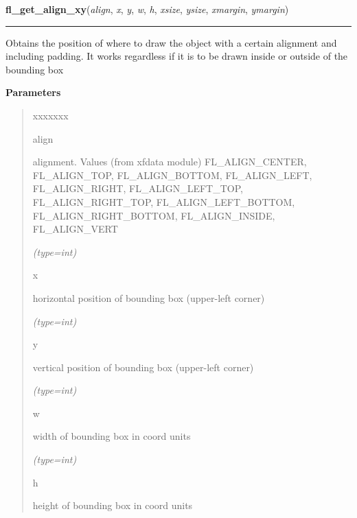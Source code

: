 \hspace{.8\funcindent}\begin{boxedminipage}{\funcwidth}

    \raggedright \textbf{fl\_get\_align\_xy}(\textit{align}, \textit{x}, \textit{y}, \textit{w}, \textit{h}, \textit{xsize}, \textit{ysize}, \textit{xmargin}, \textit{ymargin})

    \vspace{-1.5ex}

    \rule{\textwidth}{0.5\fboxrule}
\setlength{\parskip}{2ex}
    Obtains the position of where to draw the object with a certain 
    alignment and including padding. It works regardless if it is to be 
    drawn inside or outside of the bounding box

\setlength{\parskip}{1ex}
      \textbf{Parameters}
      \vspace{-1ex}

      \begin{quote}
        \begin{Ventry}{xxxxxxx}

          \item[align]

          alignment. Values (from xfdata module) FL\_ALIGN\_CENTER, 
          FL\_ALIGN\_TOP, FL\_ALIGN\_BOTTOM, FL\_ALIGN\_LEFT, 
          FL\_ALIGN\_RIGHT, FL\_ALIGN\_LEFT\_TOP, FL\_ALIGN\_RIGHT\_TOP, 
          FL\_ALIGN\_LEFT\_BOTTOM, FL\_ALIGN\_RIGHT\_BOTTOM, 
          FL\_ALIGN\_INSIDE, FL\_ALIGN\_VERT

            {\it (type=int)}

          \item[x]

          horizontal position of bounding box (upper-left corner)

            {\it (type=int)}

          \item[y]

          vertical position of bounding box (upper-left corner)

            {\it (type=int)}

          \item[w]

          width of bounding box in coord units

            {\it (type=int)}

          \item[h]

          height of bounding box in coord units


\end{Ventry}
\end{quote}
\end{boxedminipage}
